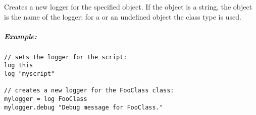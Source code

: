 \label{par:log}

Creates a new logger for the specified  object. If the object is
a string, the object is the name of the logger; for a  or an
undefined object the class type is used.

\subparagraph{Example:}

\begin{lstlisting}[style=Groovybash, label={lst:example_log}]
// sets the logger for the script:
log this
log "myscript"

// creates a new logger for the FooClass class:
mylogger = log FooClass
mylogger.debug "Debug message for FooClass."
\end{lstlisting}

